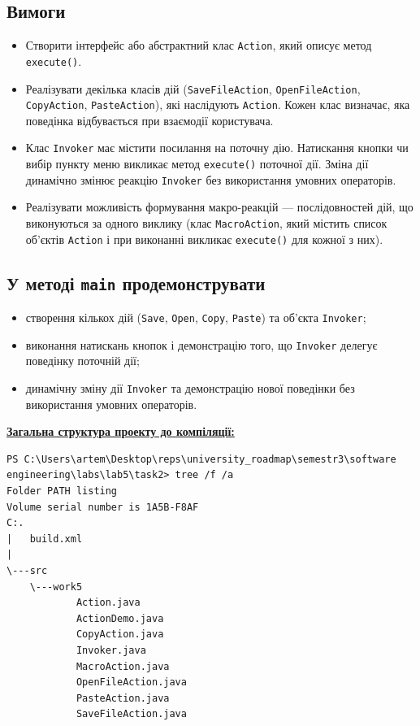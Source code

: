 \documentclass[12pt,a4paper]{article}
\begin{document}
    \subsection*{Вимоги}

    \begin{itemize}
        \item Створити інтерфейс або абстрактний клас \texttt{Action}, який описує метод
        \texttt{execute()}.
        \item Реалізувати декілька класів дій
        (\texttt{SaveFileAction}, \texttt{OpenFileAction}, \texttt{CopyAction},
        \texttt{PasteAction}), які наслідують \texttt{Action}. Кожен клас визначає,
        яка поведінка відбувається при взаємодії користувача.
        \item Клас \texttt{Invoker} має містити посилання на поточну дію. Натискання
        кнопки чи вибір пункту меню викликає метод \texttt{execute()} поточної дії.
        Зміна дії динамічно змінює реакцію \texttt{Invoker} без використання
        умовних операторів.
        \item Реалізувати можливість формування макро-реакцій --- послідовностей дій,
        що виконуються за одного виклику (клас \texttt{MacroAction}, який містить список
        об’єктів \texttt{Action} і при виконанні викликає \texttt{execute()} для кожної
        з них).
    \end{itemize}

    \subsection*{У методі \texttt{main} продемонструвати}

    \begin{itemize}
        \item створення кількох дій (\texttt{Save}, \texttt{Open}, \texttt{Copy},
        \texttt{Paste}) та об’єкта \texttt{Invoker};
        \item виконання натискань кнопок і демонстрацію того, що \texttt{Invoker}
        делегує поведінку поточній дії;
        \item динамічну зміну дії \texttt{Invoker} та демонстрацію нової поведінки
        без використання умовних операторів.
    \end{itemize}

    \textbf{\underline{Загальна структура проекту до компіляції:}}

    \begin{verbatim}
PS C:\Users\artem\Desktop\reps\university_roadmap\semestr3\software engineering\labs\lab5\task2> tree /f /a
Folder PATH listing
Volume serial number is 1A5B-F8AF
C:.
|   build.xml
|   
\---src
    \---work5
            Action.java
            ActionDemo.java
            CopyAction.java
            Invoker.java
            MacroAction.java
            OpenFileAction.java
            PasteAction.java
            SaveFileAction.java
    \end{verbatim}
\end{document}
